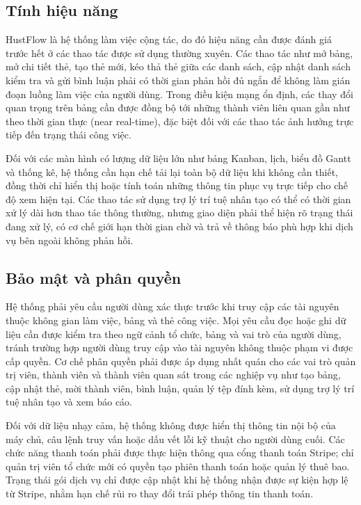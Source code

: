 \documentclass[../DoAn.tex]{subfiles}
\begin{document}
\subsection{Tính hiệu năng}
\label{subsection:2.4.1}

HustFlow là hệ thống làm việc cộng tác, do đó hiệu năng cần được đánh giá trước hết ở các thao tác được sử dụng thường xuyên. Các thao tác như mở bảng, mở chi tiết thẻ, tạo thẻ mới, kéo thả thẻ giữa các danh sách, cập nhật danh sách kiểm tra và gửi bình luận phải có thời gian phản hồi đủ ngắn để không làm gián đoạn luồng làm việc của người dùng. Trong điều kiện mạng ổn định, các thay đổi quan trọng trên bảng cần được đồng bộ tới những thành viên liên quan gần như theo thời gian thực (near real-time), đặc biệt đối với các thao tác ảnh hưởng trực tiếp đến trạng thái công việc.

Đối với các màn hình có lượng dữ liệu lớn như bảng Kanban, lịch, biểu đồ Gantt và thống kê, hệ thống cần hạn chế tải lại toàn bộ dữ liệu khi không cần thiết, đồng thời chỉ hiển thị hoặc tính toán những thông tin phục vụ trực tiếp cho chế độ xem hiện tại. Các thao tác sử dụng trợ lý trí tuệ nhân tạo có thể có thời gian xử lý dài hơn thao tác thông thường, nhưng giao diện phải thể hiện rõ trạng thái đang xử lý, có cơ chế giới hạn thời gian chờ và trả về thông báo phù hợp khi dịch vụ bên ngoài không phản hồi.

\subsection{Bảo mật và phân quyền}
\label{subsection:2.4.2}

Hệ thống phải yêu cầu người dùng xác thực trước khi truy cập các tài nguyên thuộc không gian làm việc, bảng và thẻ công việc. Mọi yêu cầu đọc hoặc ghi dữ liệu cần được kiểm tra theo ngữ cảnh tổ chức, bảng và vai trò của người dùng, tránh trường hợp người dùng truy cập vào tài nguyên không thuộc phạm vi được cấp quyền. Cơ chế phân quyền phải được áp dụng nhất quán cho các vai trò quản trị viên, thành viên và thành viên quan sát trong các nghiệp vụ như tạo bảng, cập nhật thẻ, mời thành viên, bình luận, quản lý tệp đính kèm, sử dụng trợ lý trí tuệ nhân tạo và xem báo cáo.

Đối với dữ liệu nhạy cảm, hệ thống không được hiển thị thông tin nội bộ của máy chủ, câu lệnh truy vấn hoặc dấu vết lỗi kỹ thuật cho người dùng cuối. Các chức năng thanh toán phải được thực hiện thông qua cổng thanh toán Stripe; chỉ quản trị viên tổ chức mới có quyền tạo phiên thanh toán hoặc quản lý thuê bao. Trạng thái gói dịch vụ chỉ được cập nhật khi hệ thống nhận được sự kiện hợp lệ từ Stripe, nhằm hạn chế rủi ro thay đổi trái phép thông tin thanh toán.
\end{document}
